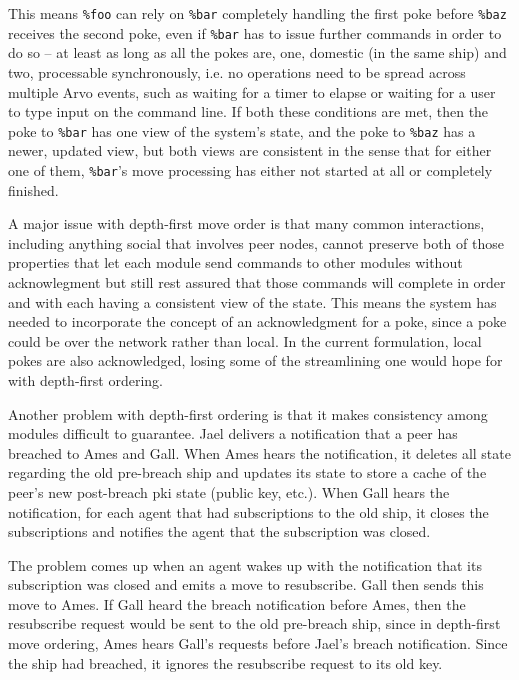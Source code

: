 \documentclass[twoside]{article}
\begin{document}
This means \lstinline[style=inlinecode]{%foo} can rely on \lstinline[style=inlinecode]{%bar} completely handling the first poke before \lstinline[style=inlinecode]{%baz} receives the second poke, even if \lstinline[style=inlinecode]{%bar} has to issue further commands in order to do so – at least as long as all the pokes are, one, domestic (in the same ship) and two, processable synchronously, i.e. no operations need to be spread across multiple Arvo events, such as waiting for a timer to elapse or waiting for a user to type input on the command line.  If both these conditions are met, then the poke to \lstinline[style=inlinecode]{%bar} has one view of the system's state, and the poke to \lstinline[style=inlinecode]{%baz} has a newer, updated view, but both views are consistent in the sense that for either one of them, \lstinline[style=inlinecode]{%bar}'s move processing has either not started at all or completely finished.

A major issue with depth-first move order is that many common interactions, including anything social that involves peer nodes, cannot preserve both of those properties that let each module send commands to other modules without acknowlegment but still rest assured that those commands will complete in order and with each having a consistent view of the state.  This means the system has needed to incorporate the concept of an acknowledgment for a poke, since a poke could be over the network rather than local.  In the current formulation, local pokes are also acknowledged, losing some of the streamlining one would hope for with depth-first ordering.

Another problem with depth-first ordering is that it makes consistency among modules difficult to guarantee.  Jael delivers a notification that a peer has breached to Ames and Gall.  When Ames hears the notification, it deletes all state regarding the old pre-breach ship and updates its state to store a cache of the peer's new post-breach {\sc pki} state (public key, etc.).  When Gall hears the notification, for each agent that had subscriptions to the old ship, it closes the subscriptions and notifies the agent that the subscription was closed.

The problem comes up when an agent wakes up with the notification that its subscription was closed and emits a move to resubscribe.  Gall then sends this move to Ames.  If Gall heard the breach notification before Ames, then the resubscribe request would be sent to the old pre-breach ship, since in depth-first move ordering, Ames hears Gall's requests before Jael's breach notification.  Since the ship had breached, it ignores the resubscribe request to its old key.
\end{document}
